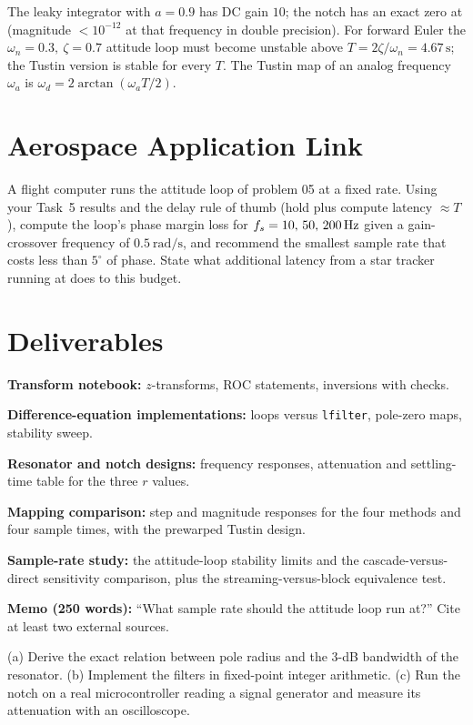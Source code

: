 \documentclass[11pt,a4paper]{article}
\begin{document}
\begin{checkpoint}
The leaky integrator with $a=0.9$ has DC gain $10$; the notch has an exact zero at  (magnitude $<10^{-12}$ at that frequency in double precision). For forward Euler the $\omega_n=0.3,\ \zeta=0.7$ attitude loop must become unstable above $T=2\zeta/\omega_n=4.67\,\mathrm{s}$; the Tustin version is stable for every $T$. The Tustin map of an analog frequency $\omega_a$ is $\omega_d=2\arctan(\omega_aT/2)$.
\end{checkpoint}

\section*{Aerospace Application Link}
A flight computer runs the attitude loop of problem 05 at a fixed rate. Using your Task~5 results and the delay rule of thumb (hold plus compute latency $\approx T$), compute the loop's phase margin loss for $f_s=10,\,50,\,\SI{200}{\hertz}$ given a gain-crossover frequency of $\SI{0.5}{\radian\per\second}$, and recommend the smallest sample rate that costs less than $5^\circ$ of phase. State what additional latency from a star tracker running at  does to this budget.

\section*{Deliverables}
\begin{delivs}
  \item[D1] \textbf{Transform notebook:} $z$-transforms, ROC statements, inversions with checks.
  \item[D2] \textbf{Difference-equation implementations:} loops versus \texttt{lfilter}, pole-zero maps, stability sweep.
  \item[D3] \textbf{Resonator and notch designs:} frequency responses, attenuation and settling-time table for the three $r$ values.
  \item[D4] \textbf{Mapping comparison:} step and magnitude responses for the four methods and four sample times, with the prewarped Tustin design.
  \item[D5] \textbf{Sample-rate study:} the attitude-loop stability limits and the cascade-versus-direct sensitivity comparison, plus the streaming-versus-block equivalence test.
  \item[D6] \textbf{Memo (250 words):} ``What sample rate should the attitude loop run at?'' Cite at least two external sources.
  \item[Bonus] (a) Derive the exact relation between pole radius and the 3-dB bandwidth of the resonator. (b) Implement the filters in fixed-point integer arithmetic. (c) Run the notch on a real microcontroller reading a signal generator and measure its attenuation with an oscilloscope.
\end{delivs}
\end{document}
